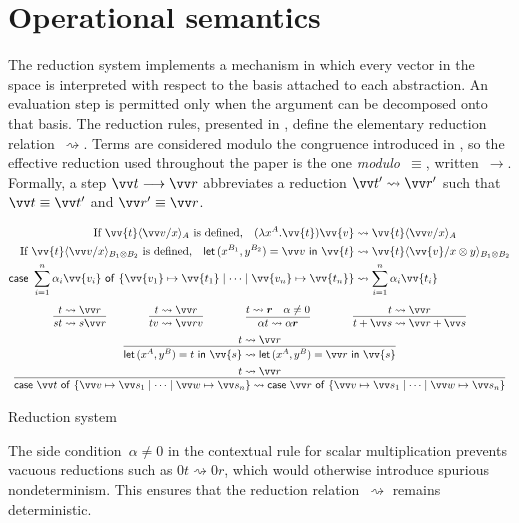 \documentclass[runningheads,orivec,envcountsame,envcountsect]{llncs}
\newcommand\lra{\longrightarrow}
\newcommand\ansubst[2]{\ensuremath{\langle #1 \rangle_{#2}}}
\def\Pair#1#2{(#1,#2)} %
\def\Lam#1#2#3{\lambda#1^{#2}{.}#3} %
\def\letkeyword{\mathsf{let}}
\def\inkeyword{\mathsf{in}}
\def\LetP#1#2#3#4#5#6{\letkeyword\,\Pair{#1^{#2}}{#3^{#4}}=#5~\inkeyword~#6}
\def\gencase#1#2#3#4#5{\ensuremath{\mathsf{case}~#1~\mathsf{of}~\{#2\mapsto #4 \mid \dotsb \mid #3\mapsto #5\}}}
\def\lraneq{\rightsquigarrow}
\begin{document}
\section{Operational semantics}\label{sec:reduction}

The reduction system implements a mechanism in which every vector in the space
is interpreted with respect to the basis attached to each abstraction. An
evaluation step is permitted only when the argument can be decomposed onto that
basis. The reduction rules, presented in
, define the elementary
reduction relation~$\lraneq$. Terms are considered modulo the congruence
introduced in , so the
effective reduction used throughout the paper is the one
\emph{modulo~$\equiv$}, written~$\lra$.  Formally, a step $\vv t\lra\vv r$
abbreviates a reduction $\vv t'\lraneq\vv r'$ such that $\vv t\equiv\vv t'$
and $\vv r'\equiv\vv r$.

\begin{table}[t]
  \begin{align*}
    \text{If }\vv{t}\ansubst{\vv v/x}{A}\text{ is defined,}\quad
    (\Lam{x}{A}{\vv{t}})\vv{v}
    &\lraneq \vv{t}\ansubst{\vv v/x}{A}\\
    \text{If }\vv{t}\ansubst{\vv v/x}{B_1\otimes B_2}\text{ is defined,}\quad
    \LetP{x}{B_1}{y}{B_2}{\vv v}{\vv{t}}
    &\lraneq \vv{t}\ansubst{\vv{v}/x\otimes y}{B_1\otimes B_2}\\
    \gencase{\sum_{i=1}^{n}\alpha_i \vv{v_i}}{\vv{v_1}}{\vv{v_n}}{\vv{t_1}}{\vv{t_n}}
    &\lraneq \sum_{i=1}^{n}\alpha_i \vv{t_i}
  \end{align*}
  \[
    \begin{array}{c}
      \infer{st\lraneq s\vv r}{t\lraneq \vv r}
      \qquad\qquad
      \infer{tv\lraneq \vv rv}{t\lraneq\vv r}
      \qquad\qquad
      \infer{\alpha t\lraneq \alpha \vec r}{t\lraneq\vec r & \alpha\neq 0}
      \qquad\qquad
      \infer{t+\vv s\lraneq\vv r+\vv s}{t\lraneq\vv r}
      \\[5pt]
      \infer{\LetP{x}{A}{y}{B}{t}{\vv{s}}\lraneq
      \LetP{x}{A}{y}{B}{\vv r}{\vv{s}}}{t\lraneq \vv r} 
      \\[5pt]
      \infer{\gencase{\vv t}{\vv v}{\vv w}{\vv s_1}{\vv s_n}\lraneq
      \gencase{\vv r}{\vv v}{\vv w}{\vv s_1}{\vv s_n}}{t\lraneq \vv r}
    \end{array}
  \]
  \caption{Reduction system}
  \label{tab:Reduction}
\end{table}

The side condition~$\alpha\neq0$ in the contextual rule for scalar
multiplication prevents vacuous reductions such as $0t\lraneq 0r$, which would
otherwise introduce spurious nondeterminism. This ensures that the reduction
relation~$\lraneq$ remains deterministic.
\end{document}
